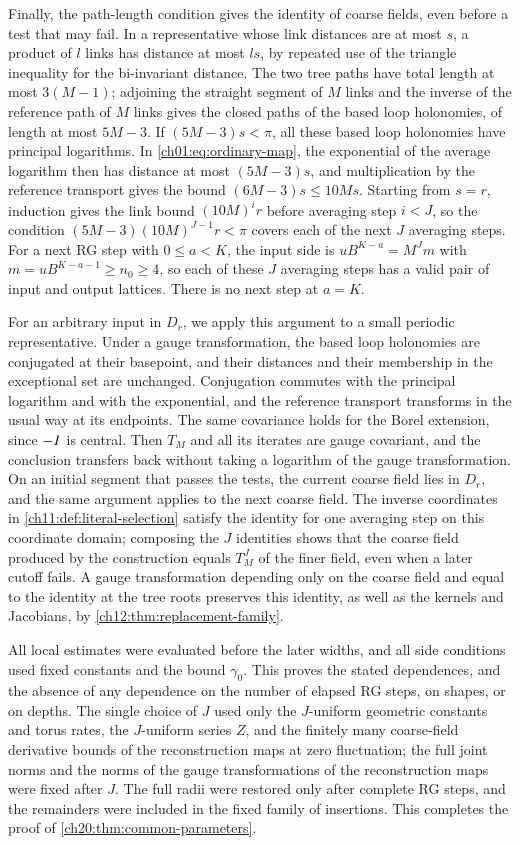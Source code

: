 Finally, the path-length condition gives the identity of coarse fields, even before a test that may fail. In a representative whose link distances are at most $s$, a product of $l$ links has distance at most $ls$, by repeated use of the triangle inequality for the bi-invariant distance. The two tree paths have total length at most $3(M-1)$; adjoining the straight segment of $M$ links and the inverse of the reference path of $M$ links gives the closed paths of the based loop holonomies, of length at most $5M-3$. If $(5M-3)s<\pi$, all these based loop holonomies have principal logarithms. In \eqref{ch01:eq:ordinary-map}, the exponential of the average logarithm then has distance at most $(5M-3)s$, and multiplication by the reference transport gives the bound $(6M-3)s\le10Ms$. Starting from $s=r$, induction gives the link bound $(10M)^ir$ before averaging step $i<J$, so the condition $(5M-3)(10M)^{J-1}r<\pi$ covers each of the next $J$ averaging steps. For a next RG step with $0\le a<K$, the input side is $uB^{K-a}=M^Jm$ with $m=uB^{K-a-1}\ge n_0\ge4$, so each of these $J$ averaging steps has a valid pair of input and output lattices. There is no next step at $a=K$.

For an arbitrary input in $D_r$, we apply this argument to a small periodic representative. Under a gauge transformation, the based loop holonomies are conjugated at their basepoint, and their distances and their membership in the exceptional set are unchanged. Conjugation commutes with the principal logarithm and with the exponential, and the reference transport transforms in the usual way at its endpoints. The same covariance holds for the Borel extension, since $-I$ is central. Then $T_M$ and all its iterates are gauge covariant, and the conclusion transfers back without taking a logarithm of the gauge transformation. On an initial segment that passes the tests, the current coarse field lies in $D_r$, and the same argument applies to the next coarse field. The inverse coordinates in \cref{ch11:def:literal-selection} satisfy the identity for one averaging step on this coordinate domain; composing the $J$ identities shows that the coarse field produced by the construction equals $T_M^J$ of the finer field, even when a later cutoff fails. A gauge transformation depending only on the coarse field and equal to the identity at the tree roots preserves this identity, as well as the kernels and Jacobians, by \cref{ch12:thm:replacement-family}.

All local estimates were evaluated before the later widths, and all side conditions used fixed constants and the bound $\gamma_0$. This proves the stated dependences, and the absence of any dependence on the number of elapsed RG steps, on shapes, or on depths. The single choice of $J$ used only the $J$-uniform geometric constants and torus rates, the $J$-uniform series $Z$, and the finitely many coarse-field derivative bounds of the reconstruction maps at zero fluctuation; the full joint norms and the norms of the gauge transformations of the reconstruction maps were fixed after $J$. The full radii were restored only after complete RG steps, and the remainders were included in the fixed family of insertions. This completes the proof of \cref{ch20:thm:common-parameters}.

